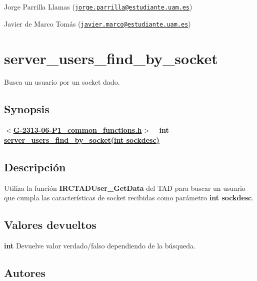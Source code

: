 \begin{DoxyItemize}
\item Jorge Parrilla Llamas (\href{mailto:jorge.parrilla@estudiante.uam.es}{\tt jorge.\+parrilla@estudiante.\+uam.\+es}) 
\item Javier de Marco Tomás (\href{mailto:javier.marco@estudiante.uam.es}{\tt javier.\+marco@estudiante.\+uam.\+es}) 
\end{DoxyItemize}\hypertarget{server_users_find_by_socket}{}\section{server\+\_\+users\+\_\+find\+\_\+by\+\_\+socket}\label{server_users_find_by_socket}
Busca un usuario por un socket dado.\hypertarget{server_users_find_by_socket_synopsis_server_users_find_by_socket}{}\subsection{Synopsis}\label{server_users_find_by_socket_synopsis_server_users_find_by_socket}
{ {\bfseries $<$\hyperlink{G-2313-06-P1__common__functions_8h}{G-\/2313-\/06-\/\+P1\+\_\+common\+\_\+functions.\+h}$>$} ~\newline
 {\bfseries int \hyperlink{G-2313-06-P1__common__functions_8c_a485e68f66db6ae4b7297d99c32afe30a}{server\+\_\+users\+\_\+find\+\_\+by\+\_\+socket(int sockdesc)}} } \hypertarget{server_users_find_by_socket_descripcion_server_users_find_by_socket}{}\subsection{Descripción}\label{server_users_find_by_socket_descripcion_server_users_find_by_socket}
Utiliza la función {\bfseries I\+R\+C\+T\+A\+D\+User\+\_\+\+Get\+Data} del T\+AD para buscar un usuario que cumpla las características de socket recibidas como parámetro {\bfseries int sockdesc}.\hypertarget{server_users_find_by_socket_return_server_users_find_by_socket}{}\subsection{Valores devueltos}\label{server_users_find_by_socket_return_server_users_find_by_socket}

\begin{DoxyItemize}
\item {\bfseries int} Devuelve valor verdado/falso dependiendo de la búsqueda. 
\end{DoxyItemize}\hypertarget{server_users_find_by_socket_authors_server_users_find_by_socket}{}\subsection{Autores}\label{server_users_find_by_socket_authors_server_users_find_by_socket}

